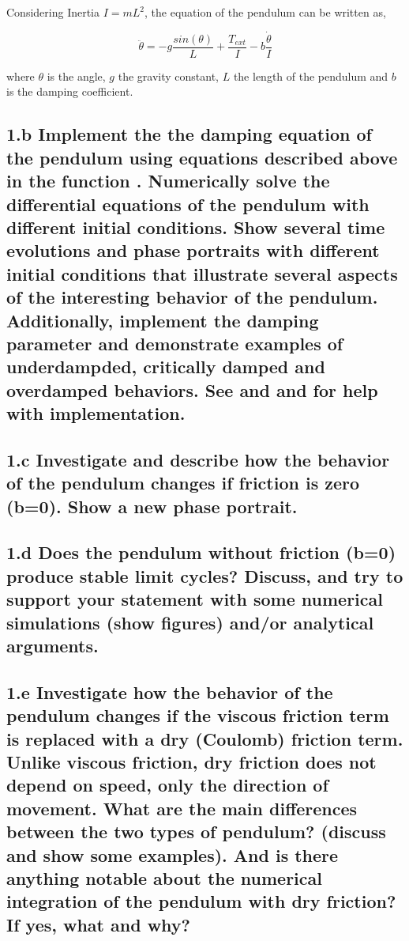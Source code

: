 \documentclass{cmc}
\begin{document}
Considering Inertia $I = mL^2$, the equation of the pendulum can be
written as,

\begin{equation}
  \label{eq:pendulum}
  \ddot{\theta} = -g\frac{sin(\theta)}{L} + \frac{T_{ext}}{I} - b \frac{\dot{\theta}}{I}
\end{equation}

where $\theta$ is the angle, $g$ the gravity constant, $L$ the length of the pendulum
and $b$ is the damping coefficient.


\subsection*{1.b Implement the the damping equation of the pendulum using equations described above in the function
  . Numerically solve the differential equations of the pendulum
  with different initial conditions.  Show several time evolutions and phase
  portraits with different initial conditions that illustrate several aspects of
  the interesting behavior of the pendulum. Additionally, implement the damping parameter and demonstrate examples of underdampded, critically damped and overdamped behaviors.
  See  and  and
   for help with implementation.}


\subsection*{1.c Investigate and describe how the behavior of the pendulum
  changes if friction is zero (b=0).  Show a new phase portrait.}


\subsection*{1.d Does the pendulum without friction (b=0) produce stable limit
  cycles? Discuss, and try to support your statement with some numerical
  simulations (show figures) and/or analytical arguments.}


\subsection*{1.e Investigate how the behavior of the pendulum changes if the
  viscous friction term is replaced with a dry (Coulomb) friction term. Unlike
  viscous friction, dry friction does not depend on speed, only the direction of
  movement. What are the main differences between the two types of pendulum?
  (discuss and show some examples). And is there anything notable about the
  numerical integration of the pendulum with dry friction? If yes, what and why?}
\end{document}
